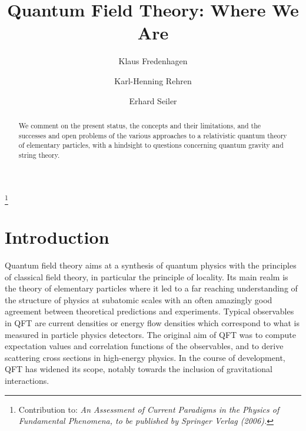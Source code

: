 \documentclass[multphys,vecphys]{svmult}
\begin{document}
\title{\bf Quantum Field Theory: Where We Are}
\author{{Klaus Fredenhagen}\and
{Karl-Henning Rehren}\and
{Erhard Seiler}}



\maketitle



\begin{abstract}  We comment on the present status, the
  concepts and their limitations, and the successes and open problems 
  of the various approaches to a relativistic quantum theory of elementary 
  particles, with a hindsight to questions concerning quantum gravity and 
  string theory. 
\end{abstract}

\renewcommand{\thefootnote}{} %

\footnote{Contribution to: \it An Assessment of Current Paradigms in
  the Physics of Fundamental Phenomena, \rm to be published by
  Springer Verlag (2006).} 
\section{Introduction}

Quantum field theory aims at a synthesis of quantum physics with the 
principles of classical field theory, in particular the principle of
locality. Its main realm is the theory of elementary
particles where it led to a far reaching understanding of the
structure of physics at subatomic scales with an often amazingly good
agreement between theoretical predictions and experiments.  
Typical observables in QFT are current densities or energy flow densities
which correspond to what is measured in particle physics detectors.
The original aim of QFT was to compute expectation values and correlation 
functions of the observables, and to derive scattering 
cross sections in high-energy physics. In the
course of development, QFT has widened its scope, notably towards the
inclusion of gravitational interactions. 
\end{document}
